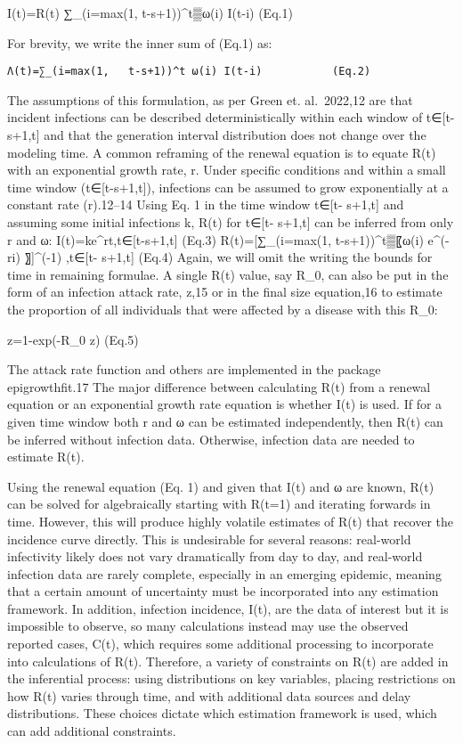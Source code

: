 \documentclass[
  letterpaper,
  DIV=11,
  numbers=noendperiod]{scrreprt}
\begin{document}
I(t)=R(t) ∑\_(i=max⁡(1, t-s+1))\^{}t▒ω(i) I(t-i) (Eq.1)

For brevity, we write the inner sum of (Eq.1) as:

\begin{verbatim}
Λ(t)=∑_(i=max⁡(1,   t-s+1))^t ω(i) I(t-i)           (Eq.2)  
\end{verbatim}

The assumptions of this formulation, as per Green et. al.~2022,12 are
that incident infections can be described deterministically within each
window of t∈{[}t-s+1,t{]} and that the generation interval distribution
does not change over the modeling time. A common reframing of the
renewal equation is to equate R(t) with an exponential growth rate, r.
Under specific conditions and within a small time window
(t∈{[}t-s+1,t{]}), infections can be assumed to grow exponentially at a
constant rate (r).12--14 Using Eq. 1 in the time window t∈{[}t- s+1,t{]}
and assuming some initial infections k, R(t) for t∈{[}t- s+1,t{]} can be
inferred from only r and ω: I(t)=ke\^{}rt,t∈{[}t-s+1,t{]} (Eq.3)
R(t)={[}∑\_(i=max⁡(1, t-s+1))\^{}t▒〖ω(i) e\^{}(-ri) 〗{]}\^{}(-1)
,t∈{[}t- s+1,t{]} (Eq.4) Again, we will omit the writing the bounds for
time in remaining formulae. A single R(t) value, say R\_0, can also be
put in the form of an infection attack rate, z,15 or in the final size
equation,16 to estimate the proportion of all individuals that were
affected by a disease with this R\_0:

z=1-exp⁡(-R\_0 z) (Eq.5)

The attack rate function and others are implemented in the package
epigrowthfit.17 The major difference between calculating R(t) from a
renewal equation or an exponential growth rate equation is whether I(t)
is used. If for a given time window both r and ω can be estimated
independently, then R(t) can be inferred without infection data.
Otherwise, infection data are needed to estimate R(t).

Using the renewal equation (Eq. 1) and given that I(t) and ω are known,
R(t) can be solved for algebraically starting with R(t=1) and iterating
forwards in time. However, this will produce highly volatile estimates
of R(t) that recover the incidence curve directly. This is undesirable
for several reasons: real-world infectivity likely does not vary
dramatically from day to day, and real-world infection data are rarely
complete, especially in an emerging epidemic, meaning that a certain
amount of uncertainty must be incorporated into any estimation
framework. In addition, infection incidence, I(t), are the data of
interest but it is impossible to observe, so many calculations instead
may use the observed reported cases, C(t), which requires some
additional processing to incorporate into calculations of R(t).
Therefore, a variety of constraints on R(t) are added in the inferential
process: using distributions on key variables, placing restrictions on
how R(t) varies through time, and with additional data sources and delay
distributions. These choices dictate which estimation framework is used,
which can add additional constraints.
\end{document}
